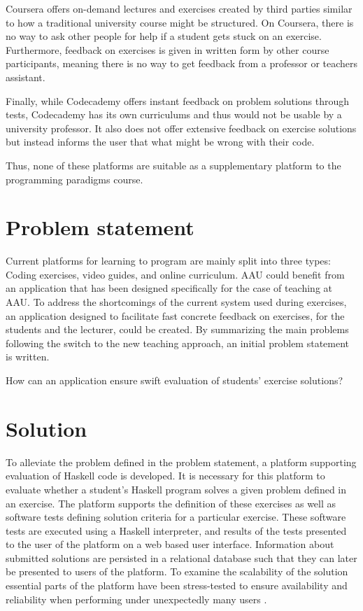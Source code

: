 Coursera offers on-demand lectures and exercises created by third parties similar to how a traditional university course might be structured.
On Coursera, there is no way to ask other people for help if a student gets stuck on an exercise.
Furthermore, feedback on exercises is given in written form by other course participants, meaning there is no way to get feedback from a professor or teachers assistant. 


Finally, while Codecademy offers instant feedback on problem solutions through tests, Codecademy has its own curriculums and thus would not be usable by a university professor. 
It also does not offer extensive feedback on exercise solutions but instead informs the user that what might be wrong with their code. 


Thus, none of these platforms are suitable as a supplementary platform to the programming paradigms course. 
\section{Problem statement}
Current platforms for learning to program are mainly split into three types: Coding exercises, video guides, and online curriculum. 
AAU could benefit from an application that has been designed specifically for the case of teaching at AAU.
To address the shortcomings of the current system used during exercises, an application designed to facilitate fast concrete feedback on exercises, for the students and the lecturer, could be created.
By summarizing the main problems following the switch to the new teaching approach, an initial problem statement is written.
\begin{displayquote}
    How can an application ensure swift evaluation of students' exercise solutions?
\end{displayquote} 

\section{Solution}
To alleviate the problem defined in the problem statement, a platform supporting evaluation of Haskell code is developed. It is necessary for this platform to evaluate whether a student's Haskell program solves a given problem defined in an exercise. The platform supports the definition of these exercises as well as software tests defining solution criteria for a particular exercise. These software tests are executed using a Haskell interpreter, and results of the tests presented to the user of the platform on a web based user interface.  
Information about submitted solutions are persisted in a relational database such that they can later be presented to users of the platform.
To examine the scalability of the solution essential parts of the platform have been stress-tested to ensure availability and reliability when performing under unexpectedly many users .

